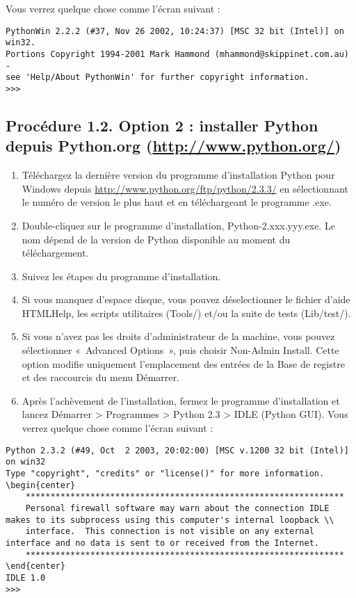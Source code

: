 Vous verrez quelque chose comme l'écran suivant :

\begin{lstlisting}[style=none]
PythonWin 2.2.2 (#37, Nov 26 2002, 10:24:37) [MSC 32 bit (Intel)] on win32.
Portions Copyright 1994-2001 Mark Hammond (mhammond@skippinet.com.au) -
see 'Help/About PythonWin' for further copyright information.
>>>
\end{lstlisting}

\subsection*{Procédure 1.2. Option 2 : installer Python depuis Python.org (\url{http://www.python.org/})}

\begin{enumerate}
    \item Téléchargez la dernière version du programme d'installation Python pour Windows depuis \url{http://www.python.org/ftp/python/2.3.3/} en sélectionnant le numéro de version le plus haut et en téléchargeant le programme .exe.
    \item  Double-cliquez sur le programme d'installation, Python-2.xxx.yyy.exe. Le nom dépend de la version de Python disponible au moment du téléchargement.
    \item Suivez les étapes du programme d'installation.
    \item  Si vous manquez d'espace disque, vous pouvez déselectionner le fichier d'aide HTMLHelp, les scripts utilitaires (Tools/) et/ou la suite de tests (Lib/test/).
    \item Si vous n'avez pas les droits d'administrateur de la machine, vous pouvez sélectionner «~Advanced Options~», puis choisir Non-Admin Install. Cette option modifie uniquement l'emplacement des entrées de la Base de registre et des raccourcis du menu Démarrer.
    \item Après l'achèvement de l'installation, fermez le programme d'installation et lancez Démarrer > Programmes > Python 2.3 > IDLE (Python GUI). Vous verrez quelque chose comme l'écran suivant :
\end{enumerate}

\begin{lstlisting}[style=none]
Python 2.3.2 (#49, Oct  2 2003, 20:02:00) [MSC v.1200 32 bit (Intel)] on win32
Type "copyright", "credits" or "license()" for more information.
\begin{center}
    ****************************************************************
    Personal firewall software may warn about the connection IDLE makes to its subprocess using this computer's internal loopback \\
    interface.  This connection is not visible on any external interface and no data is sent to or received from the Internet.
    ****************************************************************
\end{center}
IDLE 1.0
>>>
\end{lstlisting}

